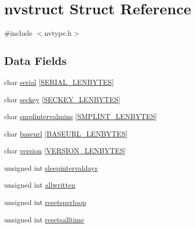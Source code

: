 \hypertarget{structnvstruct}{}\section{nvstruct Struct Reference}
\label{structnvstruct}


{\ttfamily \#include $<$nvtype.\+h$>$}

\subsection*{Data Fields}
\begin{DoxyCompactItemize}
\item 
char \mbox{\hyperlink{structnvstruct_a8c4928cc85c5336514401eb142ea7d50}{serial}} \mbox{[}\mbox{\hyperlink{nvtype_8h_a09589b0f4cf4e32679b6dc064903edef}{S\+E\+R\+I\+A\+L\+\_\+\+L\+E\+N\+B\+Y\+T\+ES}}\mbox{]}
\item 
char \mbox{\hyperlink{structnvstruct_a680c038327bbd20d30beade8d0ef1dd4}{seckey}} \mbox{[}\mbox{\hyperlink{nvtype_8h_ae32c9007f59a1d55426d7fd63e10d589}{S\+E\+C\+K\+E\+Y\+\_\+\+L\+E\+N\+B\+Y\+T\+ES}}\mbox{]}
\item 
char \mbox{\hyperlink{structnvstruct_a34de27bbd20aa5f15e4e4482ce5a0309}{smplintervalmins}} \mbox{[}\mbox{\hyperlink{nvtype_8h_a44d3fb460b6c9383a2b3248544aa13d0}{S\+M\+P\+L\+I\+N\+T\+\_\+\+L\+E\+N\+B\+Y\+T\+ES}}\mbox{]}
\item 
char \mbox{\hyperlink{structnvstruct_a727d0685583daae50e80c9eea7b16c15}{baseurl}} \mbox{[}\mbox{\hyperlink{nvtype_8h_a2d582ce7be27d531cfcc211e0bf24c0f}{B\+A\+S\+E\+U\+R\+L\+\_\+\+L\+E\+N\+B\+Y\+T\+ES}}\mbox{]}
\item 
char \mbox{\hyperlink{structnvstruct_abfbbcb0a2e866121b24841f5494ac34b}{version}} \mbox{[}\mbox{\hyperlink{nvtype_8h_ada79ed8a19f38854ae92032efcd9051b}{V\+E\+R\+S\+I\+O\+N\+\_\+\+L\+E\+N\+B\+Y\+T\+ES}}\mbox{]}
\item 
unsigned int \mbox{\hyperlink{structnvstruct_a7535c524cca52dcf1e60b1e6762fea4c}{sleepintervaldays}}
\item 
unsigned int \mbox{\hyperlink{structnvstruct_a3fee61ddd1d863385c81b1d53599191a}{allwritten}}
\item 
unsigned int \mbox{\hyperlink{structnvstruct_a48f727b15838a972aff7c7d7397ff641}{resetsperloop}}
\item 
unsigned int \mbox{\hyperlink{structnvstruct_a045498ec4eca300d51f030a958ed5ee1}{resetsalltime}}
\end{DoxyCompactItemize}


